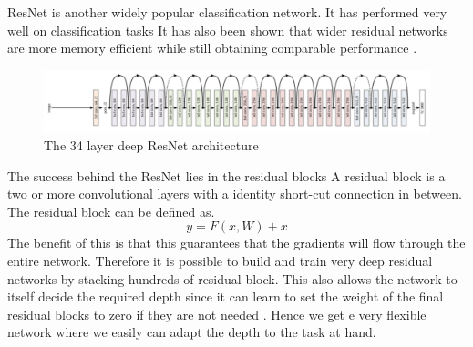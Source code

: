 \documentclass{kththesis}
\begin{document}
ResNet is another widely popular classification network. It has performed very well on classification tasks \parencite{he_identity_2016, szegedy_inception-v4_2016} It has also been shown that wider residual networks are more memory efficient while still obtaining comparable performance \parencite{wu_wider_2016, zagoruyko_wide_2016}.
\begin{figure}[h!]
  \centering
      \includegraphics[scale=0.25]{resnet}
  \caption{The 34 layer deep ResNet architecture \parencite{simonyan_very_2014}} \label{fig:vgg}
\end{figure}
The success behind the ResNet lies in the residual blocks A residual block is a two or more convolutional layers with a identity short-cut connection in between. The residual block can be defined as.
\begin{equation}
y=F(x, W) + x
\end{equation}
The benefit of this is that this guarantees that the gradients will flow through the entire network. Therefore it is possible to build and train very deep residual networks by stacking hundreds of residual block. This also allows the network to itself decide the required depth since it can learn to set the weight of the final residual blocks to zero if they are not needed \parencite{he_deep_2015}. Hence we get e very flexible network where we easily can adapt the depth to the task at hand.
\end{document}
